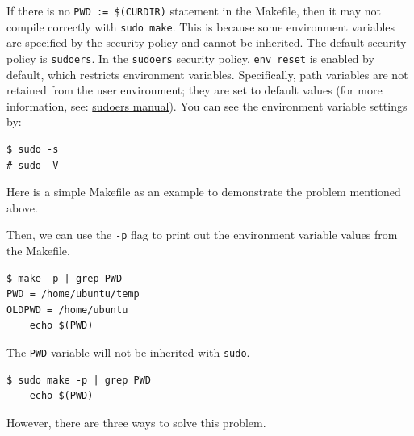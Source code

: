 \documentclass[10pt, oneside]{book}
\begin{document}
If there is no \verb|PWD := $(CURDIR)| statement in the Makefile, then it may not compile correctly with \verb|sudo make|.
This is because some environment variables are specified by the security policy and cannot be inherited.
The default security policy is \verb|sudoers|.
In the \verb|sudoers| security policy, \verb|env_reset| is enabled by default, which restricts environment variables.
Specifically, path variables are not retained from the user environment;
they are set to default values (for more information, see: \href{https://www.sudo.ws/docs/man/sudoers.man/}{sudoers manual}).
You can see the environment variable settings by:

\begin{verbatim}
$ sudo -s
# sudo -V
\end{verbatim}

Here is a simple Makefile as an example to demonstrate the problem mentioned above.


Then, we can use the \verb|-p| flag to print out the environment variable values from the Makefile.

\begin{verbatim}
$ make -p | grep PWD
PWD = /home/ubuntu/temp
OLDPWD = /home/ubuntu
	echo $(PWD)
\end{verbatim}

The \verb|PWD| variable will not be inherited with \verb|sudo|.

\begin{verbatim}
$ sudo make -p | grep PWD
	echo $(PWD)
\end{verbatim}

However, there are three ways to solve this problem.
\end{document}
